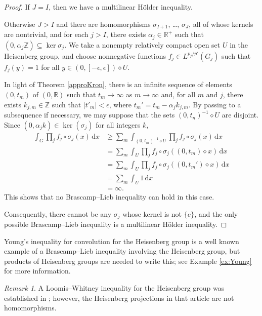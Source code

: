 \documentclass[12pt,twoside,a4paper]{amsart}
\theoremstyle{definition}
\theoremstyle{remark}
\newtheorem{rem}[thm]{Remark}%
\numberwithin{equation}{section}
\newcommand{\R}{\mathbb{R}}
\newcommand{\Z}{\mathbb{Z}}
\newcommand{\Rplus}{\mathbb{R}^+}
\newcommand{\wrt}[1]{\,\mathrm{d} #1}
\newcommand{\labs}{\left\vert}
\newcommand{\rabs}{\right\vert}
\begin{document}
\begin{proof}
If $J = I$, then we have a multilinear Hölder inequality.

Otherwise $J > I$ and  there are homomorphisms $\sigma_{I+1}$, \dots, $\sigma_J$, all of whose kernels are nontrivial, and for each $j > I$, there exists $\alpha_j \in \Rplus $ such that $(0, \alpha_j \Z) \subseteq  \ker\sigma_j$.
We take a nonempty relatively compact open set $U$ in the Heisenberg group, and choose nonnegative functions $f_j \in L^{p_j/p'}(G_j)$ such that $f_j(y) = 1$ for all $y \in ( 0,  [-\epsilon,\epsilon])  \diamond U$.

In light of Theorem \ref{approKron}, there is an infinite sequence of elements $(0,t_m)$ of $(0, \R)$ such that $t_m \to \infty$ as $m \to \infty$ and, for all $m$ and $j$, there exists $k_{j,m} \in \Z$ such that $\labs t'_m \rabs < \epsilon$, where $t_m' = t_m - \alpha_j k_{j,m}$.  
By passing to a subsequence if necessary, we may suppose that the sets $(0,t_n)^{-1} \diamond U$ are disjoint.
Since $(0, \alpha_j k) \in \ker(\sigma_j )$ for all integers $k$,
\[
\begin{aligned}
\int_{G} \prod_j  f_j \circ \sigma_j(x) \wrt x 
&\geq \sum_{m} \int_{(0,t_m)^{-1} \diamond U} \prod_j  f_j \circ \sigma_j(x) \wrt x \\
&= \sum_{m} \int_{U} \prod_j  f_j \circ \sigma_j((0,t_m) \diamond  x) \wrt x \\
&= \sum_{m} \int_{U} \prod_j  f_j \circ \sigma_j((0,t_m' ) \diamond  x) \wrt x \\
&= \sum_{m} \int_{U} 1 \wrt x \\
&= \infty.
\end{aligned}
\]
This shows that no Brascamp--Lieb inequality can hold in this case.

Consequently, there cannot be any $\sigma_j$ whose kernel is not $\{e\}$, and the only possible Brascamp--Lieb inequality is a multilinear Hölder inequality.
\end{proof}

Young's inequality for convolution for the Heisenberg group is a well known example of a Brascamp--Lieb inequality involving the Heisenberg group, but products of Heisenberg groups are needed to write this; see Example \ref{ex:Young}  for more information.


\begin{rem}
A Loomis--Whitney  inequality for the Heisenberg group was established in \cite{FP22}; however, the Heisenberg projections in that article are {not} homomorphisms.
\end{rem}
\end{document}
